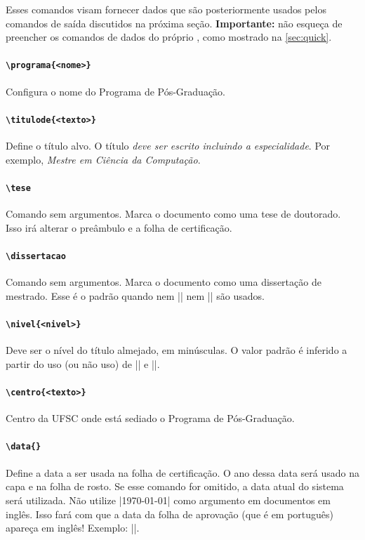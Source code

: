 \documentclass[embeddedlogo]{../ufsc-thesis-rn46-2019}
\begin{document}
Esses comandos visam fornecer dados que são posteriormente usados pelos
comandos de saída discutidos na próxima seção. \textbf{Importante:} não esqueça
de preencher os comandos de dados do próprio \abnTeX, como mostrado na
\autoref{sec:quick}.

\paragraph*{\texttt{\textbackslash{}programa\{<nome>\}}} Configura o nome do
Programa de Pós-Graduação.

\paragraph*{\texttt{\textbackslash{}titulode\{<texto>\}}} Define o título alvo.
O título \textit{deve ser escrito incluindo a especialidade}. Por exemplo,
\emph{Mestre em Ciência da Computação}.

\paragraph*{\texttt{\textbackslash{}tese}} Comando sem argumentos. Marca o
documento como uma tese de doutorado. Isso irá alterar o preâmbulo e a folha de
certificação.

\paragraph*{\texttt{\textbackslash{}dissertacao}} Comando sem argumentos. Marca
o documento como uma dissertação de mestrado. Esse é o padrão quando nem
\mt|\dissertacao| nem \mt|\tese| são usados.

\paragraph*{\texttt{\textbackslash{}nivel\{<nivel>\}}} Deve ser o nível do
título almejado, em minúsculas. O valor padrão é inferido a partir do uso (ou
não uso) de \mt|\tese| e \mt|\dissertacao|.

\paragraph*{\texttt{\textbackslash{}centro\{<texto>\}}} Centro da UFSC onde
está sediado o Programa de Pós-Graduação.

\paragraph*{\texttt{\textbackslash{}data\{<data por extenso>\}}} Define a data
a ser usada na folha de certificação. O ano dessa data será usado na capa e na
folha de rosto. Se esse comando for omitido, a data atual do sistema será
utilizada. Não utilize \mt|\today| como argumento em documentos em inglês. Isso
fará com que a data da folha de aprovação (que é em português) apareça em
inglês! Exemplo: \mt||.
\end{document}
